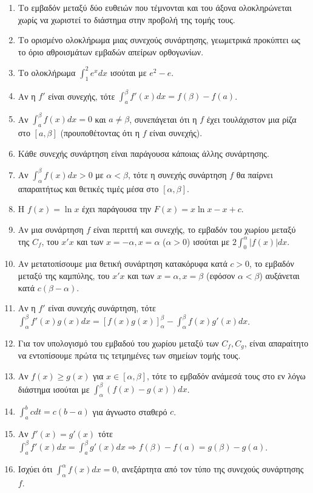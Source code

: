 \documentclass[11pt,a4paper]{article}
\newcommand{\dint}{\displaystyle\int}
\begin{document}
\begin{enumerate}[label=\textbf{3.\arabic*.}]
    \item Το εμβαδόν μεταξύ δύο ευθειών που τέμνονται και του άξονα ολοκληρώνεται χωρίς να χωριστεί το διάστημα στην προβολή της τομής τους.
    \item Το ορισμένο ολοκλήρωμα μιας συνεχούς συνάρτησης, γεωμετρικά προκύπτει ως το όριο αθροισμάτων εμβαδών απείρων ορθογωνίων.
    \item Το ολοκλήρωμα $\dint_1^2 e^x dx $ ισούται με $ e^2 - e$.
    \item Αν η $f'$ είναι συνεχής, τότε $\dint_a^\beta f'(x) dx = f(\beta) - f(a)$.
    \item Αν $\dint_a^\beta f(x) dx = 0$ και $a \ne \beta$, συνεπάγεται ότι η $f$ έχει τουλάχιστον μια ρίζα στο $[a, \beta]$ (προυποθέτοντας ότι η $f$ είναι συνεχής).
    \item Κάθε συνεχής συνάρτηση είναι παράγουσα κάποιας άλλης συνάρτησης.
    \item Αν $\dint_{\alpha}^{\beta} f(x) dx > 0$ με $\alpha < \beta$, τότε η συνεχής συνάρτηση $f$ θα παίρνει απαραιτήτως και θετικές τιμές μέσα στο $[\alpha, \beta]$.
    \item Η $f(x) = \ln x$ έχει παράγουσα την $F(x) = x\ln x - x + c$.
    \item Αν μια συνάρτηση $f$ είναι περιττή και συνεχής, το εμβαδόν του χωρίου μεταξύ της $C_f$, του $x'x$ και των $x=-\alpha, x=\alpha$ ($\alpha>0$) ισούται με $2\dint_0^\alpha |f(x)| dx$.
    \item Αν μετατοπίσουμε μια θετική συνάρτηση κατακόρυφα κατά $c>0$, το εμβαδόν μεταξύ της καμπύλης, του $x'x$ και των $x=\alpha, x=\beta$ (εφόσον $\alpha<\beta$) αυξάνεται κατά $c(\beta-\alpha)$.
    \item Αν η $f'$ είναι συνεχής συνάρτηση, τότε $\dint_{\alpha}^{\beta} f'(x)g(x)dx = [f(x)g(x)]_{\alpha}^{\beta} - \dint_{\alpha}^{\beta} f(x)g'(x)dx$.
    \item Για τον υπολογισμό του εμβαδού του χωρίου μεταξύ των $C_f, C_g$, είναι απαραίτητο να εντοπίσουμε πρώτα τις τετμημένες των σημείων τομής τους.
    \item Αν $f(x) \geq g(x)$ για $x \in [\alpha, \beta]$, τότε το εμβαδόν ανάμεσά τους στο εν λόγω διάστημα ισούται με $\dint_{\alpha}^{\beta} (f(x)-g(x)) dx$.
    \item $\dint_a^b c dt = c(b-a)$ για άγνωστο σταθερό $c$.
    \item Αν $f'(x) = g'(x)$ τότε $\dint_a^\beta f'(x)dx = \dint_a^\beta g'(x)dx \Rightarrow f(\beta)-f(a) = g(\beta)-g(a)$.
    \item Ισχύει ότι $\dint_{\alpha}^{\alpha} f(x) dx = 0$, ανεξάρτητα από τον τύπο της συνεχούς συνάρτησης $f$.

\end{enumerate}
\end{document}
